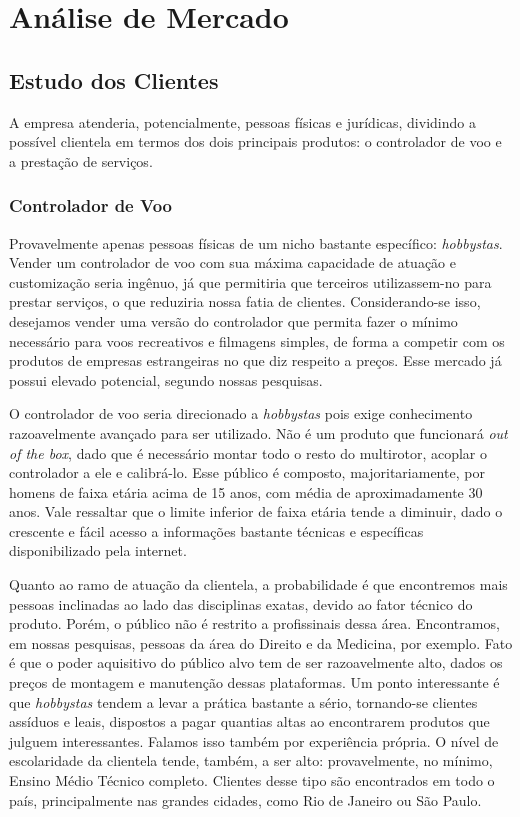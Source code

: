 \section{Análise de Mercado}

\subsection{Estudo dos Clientes}

A empresa atenderia, potencialmente, pessoas físicas e jurídicas, dividindo a possível clientela em termos
dos dois principais produtos: o controlador de voo e a prestação de serviços.

\subsubsection*{Controlador de Voo}

Provavelmente apenas pessoas físicas de um nicho bastante específico: \emph{hobbystas}. Vender um controlador de voo com sua máxima capacidade de atuação e customização seria ingênuo, já que permitiria que terceiros utilizassem-no para prestar serviços, o que reduziria nossa fatia de clientes. Considerando-se isso, desejamos vender uma versão do controlador que permita fazer o mínimo necessário para voos recreativos e filmagens simples, de forma a competir com os produtos de empresas estrangeiras no que diz respeito a preços. Esse mercado já possui elevado potencial, segundo nossas pesquisas.

O controlador de voo seria direcionado a \emph{hobbystas} pois exige conhecimento razoavelmente avançado para ser utilizado. Não é um produto que funcionará \emph{out of the box}, dado que é necessário montar todo o resto do multirotor, acoplar o controlador a ele e calibrá-lo. Esse público é composto, majoritariamente, por homens de faixa etária acima de 15 anos, com média de aproximadamente 30 anos. Vale ressaltar que o limite inferior de faixa etária tende a diminuir, dado o crescente e fácil acesso a informações bastante técnicas e específicas disponibilizado pela internet.

Quanto ao ramo de atuação da clientela, a probabilidade é que encontremos mais pessoas inclinadas ao lado das disciplinas exatas, devido ao fator técnico do produto. Porém, o público não é restrito a profissinais dessa área. Encontramos, em nossas pesquisas, pessoas da área do Direito e da Medicina, por exemplo. Fato é que o poder aquisitivo do público alvo tem de ser razoavelmente alto, dados os preços de montagem e manutenção dessas plataformas. Um ponto interessante é que \emph{hobbystas} tendem a levar a prática bastante a sério, tornando-se clientes assíduos e leais, dispostos a pagar quantias altas ao encontrarem produtos que julguem interessantes. Falamos isso também por experiência própria. O nível de escolaridade da clientela tende, também, a ser alto: provavelmente, no mínimo, Ensino Médio Técnico completo. Clientes desse tipo são encontrados em todo o país, principalmente nas grandes cidades, como Rio de Janeiro ou São Paulo.

